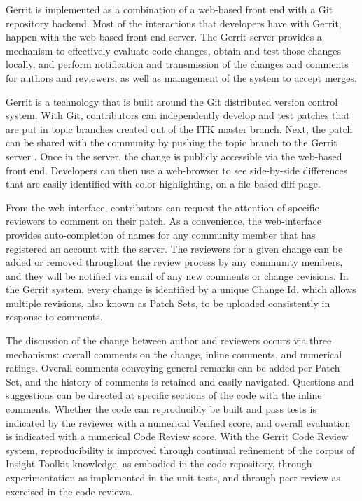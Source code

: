 \documentclass{frontiersENG} %
\begin{document}
Gerrit is implemented as a combination of a web-based front end with a Git
repository backend. Most of the interactions that developers have with Gerrit,
happen with the web-based front end server. The Gerrit server provides a
mechanism to effectively evaluate code changes, obtain and test those changes
locally, and perform notification and transmission of the changes and comments
for authors and reviewers, as well as management of the system to accept
merges.

Gerrit is a technology that is built around the Git distributed version control
system.  With Git, contributors can independently develop and test patches that
are put in topic branches created out of the ITK master branch.  Next, the
patch can be shared with the community by pushing the topic branch to the
Gerrit server \cite{ITKGerrit}.  Once in the server, the change is publicly
accessible via the web-based front end.  Developers can then use a web-browser
to see side-by-side differences that are easily identified with
color-highlighting, on a file-based diff page.

From the web interface, contributors can request the attention of specific
reviewers to comment on their patch. As a convenience, the web-interface
provides auto-completion of names for any community member that has registered
an account with the server.  The reviewers for a given change can be added or
removed throughout the review process by any community members, and they will
be notified via email of any new comments or change revisions.  In the Gerrit
system, every change is identified by a unique Change Id, which allows multiple
revisions, also known as Patch Sets, to be uploaded consistently in response to
comments.

The discussion of the change between author and reviewers occurs via three
mechanisms: overall comments on the change, inline comments, and numerical
ratings. Overall comments conveying general remarks can be added per Patch
Set, and the history of comments is retained and easily navigated. Questions
and suggestions can be directed at specific sections of the code with the
inline comments. Whether the code can reproducibly be built and pass tests is
indicated by the reviewer with a numerical Verified score, and overall
evaluation is indicated with a numerical Code Review score. With the Gerrit
Code Review system, reproducibility is improved through continual refinement of
the corpus of Insight Toolkit knowledge, as embodied in the code repository,
through experimentation as implemented in the unit tests, and through peer
review as exercised in the code reviews.
\end{document}
